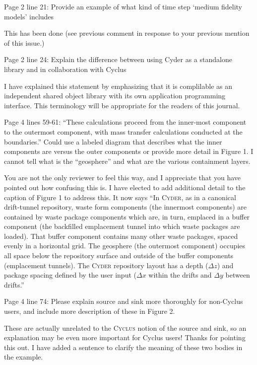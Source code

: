 \documentclass[answers,12pt]{exam}
\newcommand{\Cyclus}{\textsc{Cyclus}\xspace}%
\newcommand{\Cyder}{\textsc{Cyder}\xspace}%
\begin{document}
\begin{questions}
\question Page 2 line 21:  Provide an example of what kind of time step `medium fidelity models' includes 
\begin{solution}
        This has been done (see previous comment in response to your previous 
        mention of this issue.)
\end{solution} 
 
\question Page  2  line  24:  Explain  the  difference  between  using  Cyder  as  a  standalone  library  and  in  collaboration  with Cyclus 
\begin{solution}
I have explained this statement by emphasizing that it is complilable as an 
        independent shared object library with its own application programming 
        interface. This terminology will be appropriate for the readers of this 
        journal.
\end{solution} 
 
\question Page  4  lines  59-61:  ``These  calculations  proceed  from  the  inner-most  component  to  the  outermost 
component,  with  mass  transfer  calculations  conducted  at  the  boundaries.'' Could  use  a  labeled  diagram 
that  describes  what  the  inner  components  are  versus  the  outer  components  or  provide  more  detail  in 
Figure 1. I cannot tell what is the ``geosphere'' and what are the various containment layers. 
\begin{solution}
You are not the only reviewer to feel this way, and I appreciate that you have 
pointed out how confusing this is. I have elected to add additional detail to 
        the caption of Figure 1 to address this. It now says ``In \Cyder, as in 
        a canonical drift-tunnel repository, waste form components (the 
        innermost components) are contained by waste package components which 
        are, in turn, emplaced in a buffer component (the backfilled 
        emplacement tunnel into which waste packages are loaded). That buffer 
        component contains many other waste packages, spaced evenly in a 
        horizontal grid.  The geosphere (the outermost component) occupies all 
        space below the repository surface and outside of the buffer components 
        (emplacement tunnels). The \Cyder repository layout has a depth 
        ($\Delta z$) and package spacing defined by the user input ($\Delta x$ 
        within the drifts and $\Delta y$ between drifts.''

\end{solution} 
 
\question Page  4  line  74:  Please  explain  source  and  sink  more  thoroughly  for  non-Cyclus  users,  and include more 
description of these in Figure 2.  
\begin{solution}
These are actually unrelated to the \Cyclus notion of the source and sink, so 
        an explanation may be even more important for Cyclus users! Thanks for 
        pointing this out. I have added a sentence to clarify the meaning of 
        these two bodies in the example.
\end{solution} 
 

\end{questions}
\end{document}
